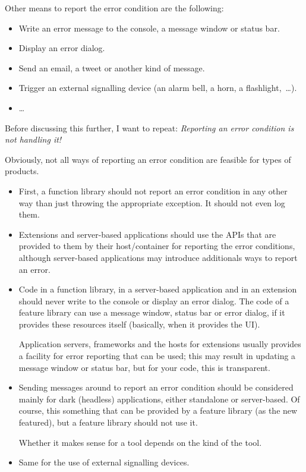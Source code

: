 \documentclass[11pt,a4paper, titlepage, parskip=half, headsepline, footsepline, cleardoublepage=current, headheight=1cm]{scrbook}
\begin{document}
Other means to report the error condition are the following:
\begin{itemize}
\item{Write an error message to the console, a message window or status bar.}
\item{Display an error dialog.}
\item{Send an email, a tweet or another kind of message.}
\item{Trigger an external signalling device (an alarm bell, a horn, a flashlight,~…).}
\item{…}
\end{itemize}

Before discussing this further, I want to repeat: \textit{Reporting an error condition is not handling it!}

Obviously, not all ways of reporting an error condition are feasible for types of products.

\begin{itemize}
\item{First, a function library should not report an error condition in any other way than just throwing the appropriate exception. It should not even log them.}

\item{Extensions and server-based applications should use the APIs that are provided to them by their host/container for reporting the error conditions, although server-based applications may introduce additionals ways to report an error.}

\item{Code in a function library, in a server-based application and in an extension should never write to the console or display an error dialog. The code of a feature library can use a message window, status bar or error dialog, if it provides these resources itself (basically, when it provides the UI).

Application servers, frameworks and the hosts for extensions usually provides a facility for error reporting that can be used; this may result in updating a message window or status bar, but for your code, this is transparent.}

\item{Sending messages around to report an error condition should be considered mainly for dark (headless) applications, either standalone or server-based. Of course, this something that can be provided by a feature library (as the new featured), but a feature library should not use it.

Whether it makes sense for a tool depends on the kind of the tool.}

\item{Same for the use of external signalling devices.}
\end{itemize}
\end{document}
